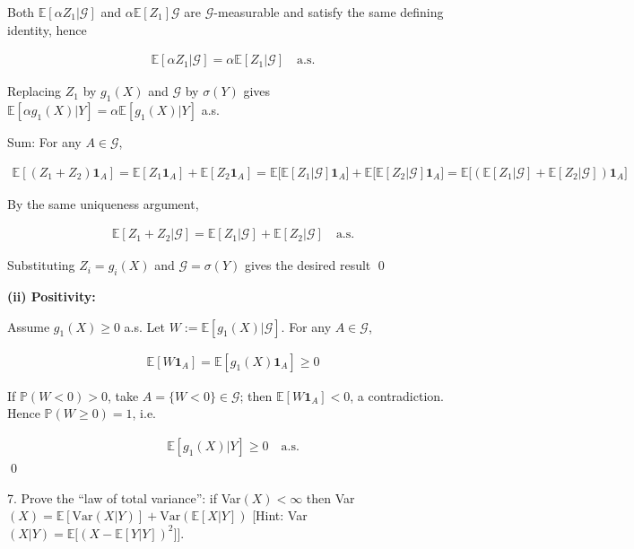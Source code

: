 \documentclass[10pt]{article}
\begin{document}
Both $\mathbb{E}[\alpha Z_1|\mathcal{G}]$ and $\alpha \mathbb{E}[Z_1]\mathcal{G}$ are $\mathcal{G}$-measurable and satisfy the same defining identity, hence 

\begin{gather*}
    \mathbb{E}[\alpha Z_1|\mathcal{G}] = \alpha \mathbb{E}[Z_1|\mathcal{G}] \quad\text{a.s.}
\end{gather*}

Replacing $Z_1$ by $g_1(X)$ and $\mathcal{G}$ by $\sigma(Y)$ gives $\mathbb{E}[\alpha g_1(X)|Y] = \alpha \mathbb{E}[g_1(X)|Y]$ a.s.

Sum: For any $A \in \mathcal{G}$,

\begin{gather*}
    \mathbb{E}[(Z_1 + Z_2)\mathbf{1}_A] = \mathbb{E}[Z_1 \mathbf{1}_A] + \mathbb{E}[Z_2 \mathbf{1}_A] = \mathbb{E}\big[\mathbb{E}[Z_1|\mathcal{G}]\mathbf{1}_A\big] +\mathbb{E}\big[\mathbb{E}[Z_2|\mathcal{G}]\mathbf{1}_A\big] = \mathbb{E}\big[(\mathbb{E}[Z_1|\mathcal{G}] + \mathbb{E}[Z_2|\mathcal{G}])\mathbf{1}_A\big]
\end{gather*}

By the same uniqueness argument, 

\begin{gather*}
    \mathbb{E}[Z_1 + Z_2|\mathcal{G}] = \mathbb{E}[Z_1|\mathcal{G}] + \mathbb{E}[Z_2|\mathcal{G}]\quad \text{a.s.}
\end{gather*}

Substituting $Z_i = g_i(X)$ and $\mathcal{G} = \sigma(Y)$ gives the desired result \qed

\newpage

\textbf{(ii) Positivity:}

Assume $g_1(X) \geq 0$ a.s. Let $W := \mathbb{E}[g_1(X)|\mathcal{G}]$. For any $A \in \mathcal{G}$,

\begin{gather*}
    \mathbb{E}[W \mathbf{1}_A] = \mathbb{E}[g_1(X)\mathbf{1}_A] \geq 0
\end{gather*}

If $\mathbb{P}(W < 0) > 0$, take $A = \{ W < 0\} \in \mathcal{G}$; then $\mathbb{E}[W \mathbf{1}_A] < 0$, a contradiction. Hence $\mathbb{P}(W \geq 0) = 1$, i.e.

\begin{gather*}
    \mathbb{E}[g_1(X)|Y] \geq 0 \quad\text{a.s.}
\end{gather*}
\qed

7. Prove the ``law of total variance'': if Var$(X) < \infty$ then Var$(X) = \mathbb{E}[\text{Var}(X|Y)] + \text{Var}(\mathbb{E}[X|Y])$ 
[Hint: Var$(X|Y) = \mathbb{E}\big[(X - \mathbb{E}[Y|Y])^2\big]$].
\end{document}
